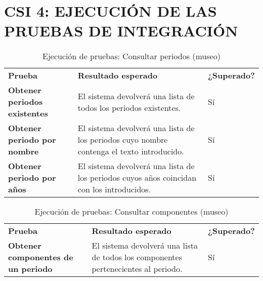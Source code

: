 \newpage
\section{CSI 4: EJECUCIÓN DE LAS PRUEBAS DE INTEGRACIÓN}
\begin{table}[H]
  \centering
  \caption{Ejecución de pruebas: Consultar periodos (museo)}
    \begin{tabular}{p{9em}p{22em}p{5em}}
    \toprule
    \rowcolor[rgb]{ .851,  .886,  .953} \multicolumn{3}{p{36em}}{\textbf{Consultar periodos (museo)}} \\ \midrule
    \rowcolor[rgb]{ .949,  .949,  .949} \textbf{Prueba} & \textbf{Resultado esperado} & \textbf{¿Superado?} \\ \midrule
    \textbf{Obtener periodos existentes} & El sistema devolverá una lista de todos los periodos existentes. & Sí \\ \midrule
    \textbf{Obtener periodo por nombre} & El sistema devolverá una lista de los periodos cuyo nombre contenga el texto introducido. & Sí \\ \midrule
    \textbf{Obtener periodo por años} & El sistema devolverá una lista de los periodos cuyos años coincidan con los introducidos. & Sí \\ \bottomrule
    \end{tabular}%
\end{table}%
\begin{table}[H]
\vspace{-4mm}
  \centering
  \caption{Ejecución de pruebas: Consultar componentes (museo)}
    \begin{tabular}{p{11em}p{20em}p{5em}}
    \toprule
    \rowcolor[rgb]{ .851,  .886,  .953} \multicolumn{3}{p{36em}}{\textbf{Consultar componentes (museo)}} \\ \midrule
    \rowcolor[rgb]{ .949,  .949,  .949} \textbf{Prueba} & \textbf{Resultado esperado} & \textbf{¿Superado?} \\ \midrule
    \textbf{Obtener componentes de un periodo} & El sistema devolverá una lista de todos los componentes pertenecientes al periodo. & Sí \\ \bottomrule
    \end{tabular}%
\end{table}%
